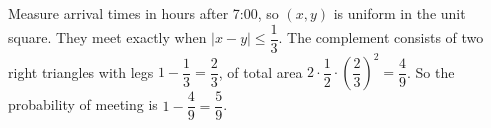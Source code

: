 Measure arrival times in hours after 7:00, so $(x,y)$ is uniform in the unit square. They meet exactly when $|x-y|\le\dfrac13$. The complement consists of two right triangles with legs $1-\dfrac13=\dfrac23$, of total area $2\cdot\dfrac12\cdot\left(\dfrac23\right)^2=\dfrac49$. So the probability of meeting is $1-\dfrac49=\boxed{\dfrac59}$.
